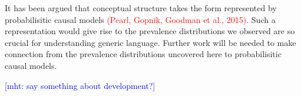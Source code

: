 \documentclass[12pt,letterpaper]{article}
\newcommand{\red}[1]{\textcolor{Red}{#1}}
\newcommand{\mht}[1]{\textcolor{Blue}{[mht: #1]}}
\begin{document}
It has been argued that conceptual structure takes the form represented by probabilisitic causal models \red{(Pearl, Gopnik, Goodman et al., 2015)}. 
Such a representation would give rise to the prevalence distributions we observed are so crucial for understanding generic language. 
Further work will be needed to make connection from the prevalence distributions uncovered here to probabilisitic causal models.

\mht{say something about development?}






%


\end{document}
